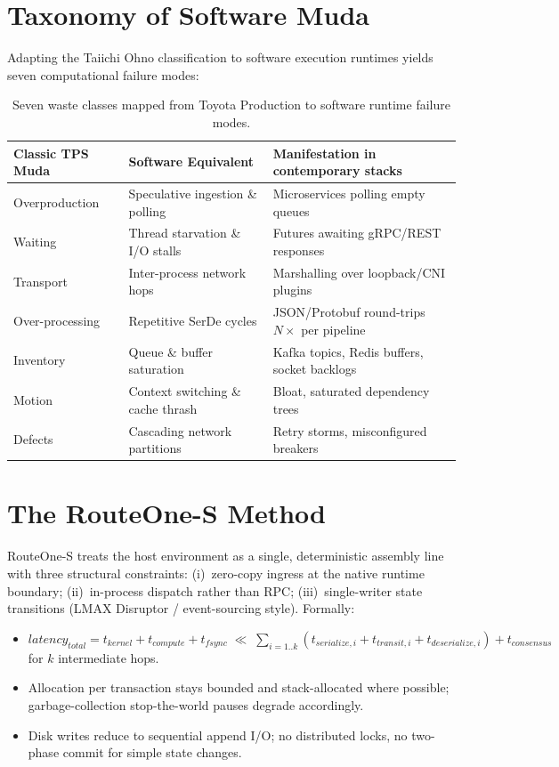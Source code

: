 \documentclass[10pt,conference]{IEEEtran}
\begin{document}
\section{Taxonomy of Software Muda}
Adapting the Taiichi Ohno classification to software execution runtimes yields
seven computational failure modes:
\begin{table}[t]
\centering
\begin{tabular}{@{}llp{5.6cm}@{}}
\toprule
\textbf{Classic TPS Muda} & \textbf{Software Equivalent} & \textbf{Manifestation in contemporary stacks} \\
\midrule
Overproduction & Speculative ingestion \& polling & Microservices polling empty queues \\
Waiting & Thread starvation \& I/O stalls & Futures awaiting gRPC/REST responses \\
Transport & Inter-process network hops & Marshalling over loopback/CNI plugins \\
Over-processing & Repetitive SerDe cycles & JSON/Protobuf round-trips $N\times$ per pipeline \\
Inventory & Queue \& buffer saturation & Kafka topics, Redis buffers, socket backlogs \\
Motion & Context switching \& cache thrash & Bloat, saturated dependency trees \\
Defects & Cascading network partitions & Retry storms, misconfigured breakers \\
\bottomrule
\end{tabular}
\caption{Seven waste classes mapped from Toyota Production to software runtime failure modes.}
\label{tab:muda}
\end{table}

\section{The RouteOne-S Method}
RouteOne-S treats the host environment as a single, deterministic assembly
line with three structural constraints: (i)~zero-copy ingress at the native
runtime boundary; (ii)~in-process dispatch rather than RPC; (iii)~single-writer
state transitions (LMAX Disruptor / event-sourcing style). Formally:
\begin{itemize}
\item $\mathit{latency_{total}} = t_{kernel} + t_{compute} + t_{fsync}
\;\ll\; \sum_{i=1..k}(t_{serialize,i}+t_{transit,i}+t_{deserialize,i}) + t_{consensus}$
for $k$ intermediate hops.
\item Allocation per transaction stays bounded and stack-allocated where
possible; garbage-collection stop-the-world pauses degrade accordingly.
\item Disk writes reduce to sequential append I/O; no distributed locks, no
two-phase commit for simple state changes.
\end{itemize}
\end{document}
